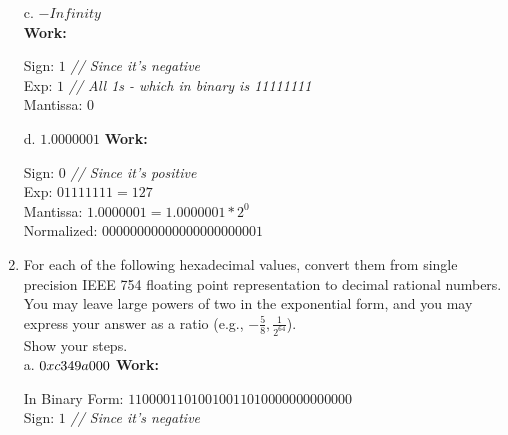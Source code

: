 \documentclass[11pt]{article}
\begin{document}
\begin{enumerate}
\begin{center}
{\begin{minipage}{23em}
        \end{minipage}}
    \end{center}
    c. \textit{$-Infinity$}\\
    \textbf{Work:}
    \begin{center}
        Sign: $1$ \textit{// Since it's negative}\\
        Exp: $1$ \textit{// All 1s - which in binary is 11111111}\\
        Mantissa: $0$\\
    \end{center}
    d. $1.0000001$
    \textbf{Work:}
    \begin{center}
        Sign: $0$ \textit{// Since it's positive}\\
        Exp: $01111111 = 127$\\
        Mantissa: $1.0000001 = 1.0000001 * 2^0$\\
        Normalized: $00000000000000000000001$
    \end{center}
    \item For each of the following hexadecimal values, convert them from single precision IEEE 754
    floating point representation to decimal rational numbers. You may leave large powers of
    two in the exponential form, and you may express your answer as a ratio (e.g., $-\frac{5}{8}, \frac{1}{2^{64}}$). \\
    Show your steps.\\
    a. $0xc349a000\\$
    \textbf{Work:}
    \begin{center}
        In Binary Form: $1100 0011 0100 1001 1010 0000 0000 0000$\\
        Sign: $1$ \textit{// Since it's negative}\\

\end{center}
\end{enumerate}
\end{document}
